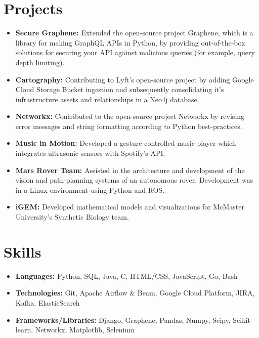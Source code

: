 \documentclass[letterpaper,11pt]{article}
\newcommand{\resumeItem}[2]{
  \item\small{
    \textbf{#1}{ #2 \vspace{-2pt}}
  }
}
\newcommand{\resumeSubItem}[2]{\resumeItem{#1}{#2}\vspace{-4pt}}
\newcommand{\resumeSubHeadingListStart}{\begin{itemize}[leftmargin=*]}
\newcommand{\resumeSubHeadingListEnd}{\end{itemize}}
\begin{document}
\section{Projects}
  \resumeSubHeadingListStart
    \resumeSubItem{Secure Graphene:}
      {Extended the open-source project Graphene, which is a library for making GraphQL APIs in Python, by providing out-of-the-box solutions for securing your API against malicious queries (for example, query depth limiting).}
    \resumeSubItem{Cartography:}
      {Contributing to Lyft's open-source project by adding Google Cloud Storage Bucket ingestion and subsequently consolidating it's infrastructure assets and relationships in a Neo4j database.}
    \resumeSubItem{Networkx:}
      {Contributed to the open-source project Networkx by revising error messages and string formatting according to Python best-practices.}
    \resumeSubItem{Music in Motion:}
      {Developed a gesture-controlled music player which integrates ultrasonic sensors with Spotify's API.}
    \resumeSubItem{Mars Rover Team:}
      {Assisted in the architecture and development of the vision and path-planning systems of an autonomous rover. Development was in a Linux environment using Python and ROS.}
    \resumeSubItem{iGEM:}
      {Developed mathematical models and visualizations for McMaster University's Synthetic Biology team.}
  \resumeSubHeadingListEnd

%
\section{Skills}
 \resumeSubHeadingListStart
    \resumeSubItem{Languages:}
      {Python, SQL, Java, C, HTML/CSS, JavaScript, Go, Bash}
    \resumeSubItem{Technologies:}
      {Git, Apache Airflow \& Beam, Google Cloud Platform, JIRA, Kafka, ElasticSearch}
    \resumeSubItem{Frameworks/Libraries:}
      {Django, Graphene, Pandas, Numpy, Scipy, Scikit-learn, Networkx, Matplotlib, Selenium}
 \resumeSubHeadingListEnd

\end{document}
